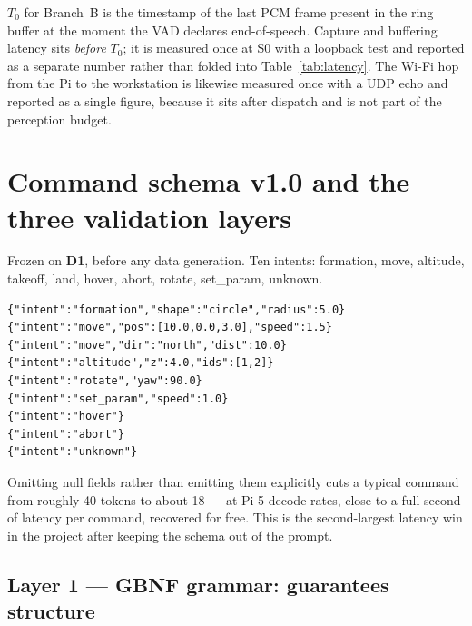 \documentclass[11pt,a4paper]{article}
\newcommand{\code}[1]{{\ttfamily\small #1}}
\begin{document}
$T_0$ for Branch~B is the timestamp of the last PCM frame present in the ring buffer at the moment the VAD
declares end-of-speech. Capture and buffering latency sits \emph{before} $T_0$; it is measured once at S0
with a loopback test and reported as a separate number rather than folded into Table~\ref{tab:latency}.
The Wi-Fi hop from the Pi to the workstation is likewise measured once with a UDP echo and reported as a
single figure, because it sits after dispatch and is not part of the perception budget.

\section{Command schema v1.0 and the three validation layers}
\label{sec:schema}

Frozen on \textbf{D1}, before any data generation. Ten intents: \code{formation}, \code{move},
\code{altitude}, \code{takeoff}, \code{land}, \code{hover}, \code{abort}, \code{rotate},
\code{set\_param}, \code{unknown}.

\begin{lstlisting}[caption={Wire format --- single-line JSON, fixed key order, null fields omitted},captionpos=b]
{"intent":"formation","shape":"circle","radius":5.0}
{"intent":"move","pos":[10.0,0.0,3.0],"speed":1.5}
{"intent":"move","dir":"north","dist":10.0}
{"intent":"altitude","z":4.0,"ids":[1,2]}
{"intent":"rotate","yaw":90.0}
{"intent":"set_param","speed":1.0}
{"intent":"hover"}
{"intent":"abort"}
{"intent":"unknown"}
\end{lstlisting}

Omitting null fields rather than emitting them explicitly cuts a typical command from roughly 40 tokens to
about 18 --- at Pi 5 decode rates, close to a full second of latency per command, recovered for free. This
is the second-largest latency win in the project after keeping the schema out of the prompt.

\subsection{Layer 1 --- GBNF grammar: guarantees structure}
\end{document}
